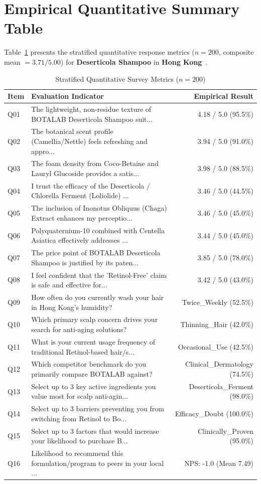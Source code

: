 \documentclass[10pt,twocolumn,a4paper]{article}
\begin{document}
\section{Empirical Quantitative Summary Table}
Table~\ref{tab:metrics} presents the stratified quantitative response metrics ($n = 200$, composite mean $= 3.71/5.00$) for \textbf{Deserticola Shampoo} in \textbf{Hong Kong}~\cite{ref_kaggle_doi,ref_hf_doi}.

\begin{table}[t]
\centering
\caption{Stratified Quantitative Survey Metrics ($n = 200$)}
\label{tab:metrics}
\small
\begin{tabularx}{\textwidth}{l X r}
\toprule
\textbf{Item} & \textbf{Evaluation Indicator} & \textbf{Empirical Result} \\
\midrule
Q01 & The lightweight, non-residue texture of BOTALAB Deserticola Shampoo suit... & 4.18 / 5.0 (95.5\%) \\
Q02 & The botanical scent profile (Camellia/Nettle) feels refreshing and appro... & 3.94 / 5.0 (91.0\%) \\
Q03 & The foam density from Coco-Betaine and Lauryl Glucoside provides a satis... & 3.98 / 5.0 (88.5\%) \\
Q04 & I trust the efficacy of the Deserticola / Chlorella Ferment (Loliolide) ... & 3.46 / 5.0 (44.5\%) \\
Q05 & The inclusion of Inonotus Obliquus (Chaga) Extract enhances my perceptio... & 3.46 / 5.0 (45.0\%) \\
Q06 & Polyquaternium-10 combined with Centella Asiatica effectively addresses ... & 3.44 / 5.0 (45.0\%) \\
Q07 & The price point of BOTALAB Deserticola Shampoo is justified by its paten... & 3.85 / 5.0 (78.0\%) \\
Q08 & I feel confident that the 'Retinol-Free' claim is safe and effective for... & 3.42 / 5.0 (43.0\%) \\
Q09 & How often do you currently wash your hair in Hong Kong's humidity? & Twice\_Weekly (52.5\%) \\
Q10 & Which primary scalp concern drives your search for anti-aging solutions? & Thinning\_Hair (42.0\%) \\
Q11 & What is your current usage frequency of traditional Retinol-based hair/s... & Occasional\_Use (42.5\%) \\
Q12 & Which competitor benchmark do you primarily compare BOTALAB against? & Clinical\_Dermatology (74.5\%) \\
Q13 & Select up to 3 key active ingredients you value most for scalp anti-agin... & Deserticola\_Ferment (98.0\%) \\
Q14 & Select up to 3 barriers preventing you from switching from Retinol to Bo... & Efficacy\_Doubt (100.0\%) \\
Q15 & Select up to 3 factors that would increase your likelihood to purchase B... & Clinically\_Proven (95.0\%) \\
Q16 & Likelihood to recommend this formulation/program to peers in your local ... & NPS: -1.0 (Mean 7.49) \\
\bottomrule
\end{tabularx}
\end{table}
\end{document}
